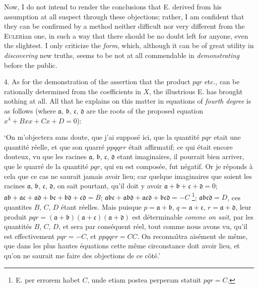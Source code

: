 \documentclass[12pt]{memoir}
\theoremstyle{plain}
\theoremstyle{remark}
\begin{document}
Now, I do not intend to render the conclusions that \textsc{E.} derived from his assumption at all suspect through these objections; rather, I am confident that they can be confirmed by a method neither difficult nor very different from the \textsc{Euler}ian one, in such a way that there should be no doubt left for anyone, even the slightest. I only criticize the \textit{form}, which, although it can be of great utility in \textit{discovering} new truths, seems to be not at all commendable in \textit{demonstrating} before the public.

4. As for the demonstration of the assertion that the product \(pqr\) etc., can be rationally determined from the coefficients in \(X\), the illustrious \textsc{E.} has brought nothing at all. All that he explains on this matter in equations of \textit{fourth degree} is as follows (where \(\mathfrak{a}\), \(\mathfrak{b}\), \(\mathfrak{c}\), \(\mathfrak{d}\) are the roots of the proposed equation \(x^4 + B xx + C x + D = 0\)):

`On m'objectera sans doute, que j'ai suppos\'e ici, que la quantit\'e \(pqr\) etait une quantit\'e r\'eelle, et que son quarr\'e \(ppqqrr\) \'etait affirmatif; ce qui \'etait encore douteux, vu que les racines \(\mathfrak{a}\), \(\mathfrak{b}\), \(\mathfrak{c}\), \(\mathfrak{d}\) etant imaginaires, il pourrait bien arriver, que le quarr\'e de la quantit\'e \(pqr\), qui en est compos\'ee, fut n\'egatif. Or je r\'eponds \`a cela que ce cas ne saurait jamais avoir lieu; car quelque imaginaires que soient les racines \(\mathfrak{a}\), \(\mathfrak{b}\), \(\mathfrak{c}\), \(\mathfrak{d}\), on sait pourtant, qu'il doit y avoir \(\mathfrak{a} + \mathfrak{b} + \mathfrak{c} + \mathfrak{d} = 0 \); \(\mathfrak{a}\mathfrak{b} + \mathfrak{a}\mathfrak{c} + \mathfrak{a}\mathfrak{d} + \mathfrak{b}\mathfrak{c} + \mathfrak{b}\mathfrak{d} + \mathfrak{c}\mathfrak{d} = B\); \(\mathfrak{a}\mathfrak{b}\mathfrak{c}+\mathfrak{a}\mathfrak{b}\mathfrak{d}+\mathfrak{a}\mathfrak{c}\mathfrak{d}+\mathfrak{b}\mathfrak{c}\mathfrak{d} = -C\) \footnote{\textsc{E.} per errorem habet \(C\), unde etiam postea perperam statuit \(pqr = C\).}; \(\mathfrak{a}\mathfrak{b}\mathfrak{c}\mathfrak{d}=D\), ces quantites \(B\), \(C\), \(D\) \'etant r\'eelles. Mais puisque \(p = \mathfrak{a} + \mathfrak{b}\), \(q =\mathfrak{a} + \mathfrak{c}\), \(r = \mathfrak{a} + \mathfrak{d}\), leur produit \(pqr = (\mathfrak{a} + \mathfrak{b})(\mathfrak{a} + \mathfrak{c})(\mathfrak{a} + \mathfrak{d})\) est d\'eterminable \textit{comme on sait}, par les quantit\'es \(B\), \(C\), \(D\), et sera par cons\'equent r\'eel, tout comme nous avons vu, qu'il est effectivement \(pqr = -C\), et \(ppqqrr = CC\). On reconna\^{\i}tra ais\'ement de m\^eme, que dans les plus hautes \'equations cette m\^eme circonstance doit avoir lieu, et qu'on ne saurait me faire des objections de ce c\^ot\'e.' 
\end{document}
